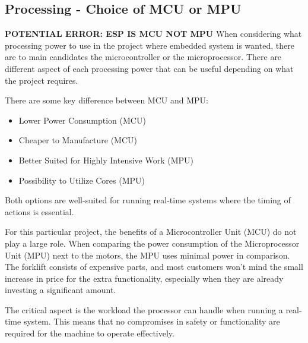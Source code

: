 \documentclass[../report.tex]{subfiles}
\begin{document}
\subsection{Processing - Choice of MCU or MPU}

    \textbf{POTENTIAL ERROR: ESP IS MCU NOT MPU}
    When considering what processing power to use in the project where embedded
    system is wanted, there are to main candidates the microcontroller or the
    microprocessor. There are different aspect of each processing power that
    can be useful depending on what the project requires. 

    There are some key difference between MCU and MPU:
    \begin{itemize}
        \item Lower Power Consumption (MCU)
        \item Cheaper to Manufacture (MCU)
        \item Better Suited for Highly Intensive Work (MPU)
        \item Possibility to Utilize Cores (MPU)
    \end{itemize}

    Both options are well-suited for running real-time systems where the timing
    of actions is essential.

    For this particular project, the benefits of a Microcontroller Unit (MCU)
    do not play a large role. When comparing the power consumption of the
    Microprocessor Unit (MPU) next to the motors, the MPU uses minimal power in
    comparison. The forklift consists of expensive parts, and most customers
    won't mind the small increase in price for the extra functionality,
    especially when they are already investing a significant amount.
    
    The critical aspect is the workload the processor can handle when running a
    real-time system. This means that no compromises in safety or functionality
    are required for the machine to operate effectively.
\end{document}
